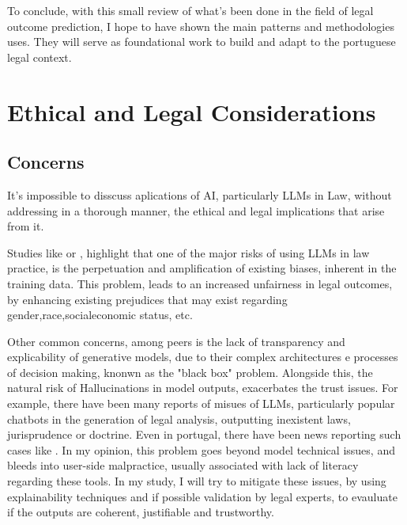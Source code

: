 \documentclass[11pt,a4paper,twoside,openright]{book}
\begin{document}
\par To conclude, with this small review of what's been done in the field of legal outcome prediction,
I hope to have shown the main patterns and methodologies uses. 
They will serve as foundational work to build and adapt to the portuguese legal context.












\section{Ethical and Legal Considerations}
\subsection{Concerns}

It's impossible to disscuss aplications of AI, particularly LLMs in Law, without addressing in a thorough manner, the ethical and legal implications that arise from it.

\par Studies like \textcite{remolina_ai_2024} or \textcite{jialin_exploring_2026}, highlight that one of the major risks of using LLMs in law practice, is the perpetuation and amplification of existing biases, inherent in the training data. 
This problem, leads to an increased unfairness in legal outcomes, by enhancing existing prejudices that may exist regarding gender,race,socialeconomic status, etc.

\par Other common concerns, among peers is the lack of transparency and explicability of generative models, due to their complex architectures e processes of decision making, knonwn as the "black box" problem. 
Alongside this, the natural risk of Hallucinations in model outputs, exacerbates the trust issues. 
For example, there have been many reports of misues of LLMs, particularly popular chatbots in the generation of legal analysis, outputting inexistent laws, jurisprudence or doctrine. 
Even in portugal, there have been news reporting such cases like \textcite{publico2025alegado}. In my opinion, this problem goes beyond model technical issues, and bleeds into user-side malpractice, usually associated with lack of literacy regarding these tools.
In my study, I will try to mitigate these issues, by using explainability techniques and if possible validation by legal experts, to evauluate if the outputs are coherent, justifiable and trustworthy.
\end{document}
